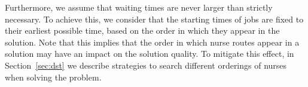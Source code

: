 \documentclass[a4paper,11pt,authoryear]{elsarticle}
\begin{document}
\noindent Furthermore, we assume that waiting times are never larger than strictly necessary. To achieve this, we consider that the starting times of jobs are fixed to their earliest possible time, based on the order in which they appear in the solution. Note that this implies that the order in which nurse routes appear in a solution may have an impact on the solution quality. To mitigate this effect, in Section~\ref{sec:dst} we describe strategies to search different orderings of nurses when solving the problem.


\end{document}

